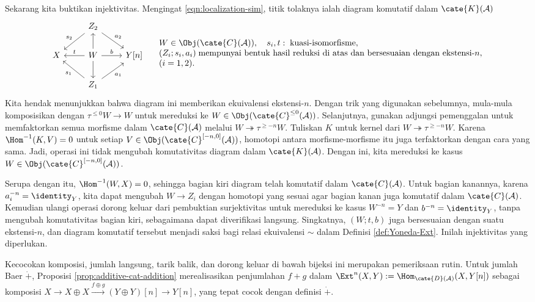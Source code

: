 \begin{bukti}
	Sekarang kita buktikan injektivitas. Mengingat
	\eqref{eqn:localization-sim}, titik tolaknya ialah diagram komutatif dalam
	$\cate{K}(\mathcal{A})$
	\[\begin{tikzcd}
		& Z_2 \arrow[ld, "s_2"'] \arrow[rd, "a_2"] & \\
		X & W \arrow[l, "t"'] \arrow[r, "b"] \arrow[u] \arrow[d] & Y[n] \\
		& Z_1 \arrow[lu, "s_1"] \arrow[ru, "a_1"'] & 
	\end{tikzcd} \quad \begin{array}{l}
		W \in \Obj(\cate{C}(\mathcal{A})), \quad s_i, t: \;\text{kuasi-isomorfisme}, \\
		(Z_i; s_i, a_i) \;\text{mempunyai bentuk hasil reduksi di atas dan bersesuaian dengan ekstensi-$n$},\\
		(i = 1, 2) .
	\end{array}\]
	Kita hendak menunjukkan bahwa diagram ini memberikan ekuivalensi
	ekstensi-$n$. Dengan trik yang digunakan sebelumnya, mula-mula komposisikan
	dengan $\tau^{\leq 0} W \to W$ untuk mereduksi ke
	$W \in \Obj(\cate{C}^{\leq 0}(\mathcal{A}))$. Selanjutnya, gunakan adjungsi
	pemenggalan untuk memfaktorkan semua morfisme dalam $\cate{C}(\mathcal{A})$
	melalui $W \twoheadrightarrow \tau^{\geq -n} W$. Tuliskan $K$
	untuk kernel
	dari $W \twoheadrightarrow \tau^{\geq -n} W$. Karena
	$\Hom^{-1}(K, V) = 0$ untuk setiap
	$V \in \Obj(\cate{C}^{[-n, 0]}(\mathcal{A}))$, homotopi antara
	morfisme-morfisme itu juga terfaktorkan dengan cara yang sama. Jadi,
	operasi ini
	tidak mengubah komutativitas diagram dalam $\cate{K}(\mathcal{A})$. Dengan
	ini, kita mereduksi ke kasus
	$W \in \Obj(\cate{C}^{[-n, 0]}(\mathcal{A}))$.

	Serupa dengan itu, $\Hom^{-1}(W, X) = 0$, sehingga bagian kiri diagram telah
	komutatif dalam $\cate{C}(\mathcal{A})$. Untuk bagian kanannya, karena
	$a_i^{-n} = \identity_Y$, kita dapat mengubah $W \to Z_i$ dengan homotopi
	yang sesuai agar bagian kanan juga komutatif dalam $\cate{C}(\mathcal{A})$.
	Kemudian ulangi operasi dorong keluar dari pembuktian surjektivitas untuk
	mereduksi ke kasus $W^{-n} = Y$ dan $b^{-n} = \identity_Y$, tanpa mengubah
	komutativitas bagian kiri, sebagaimana dapat diverifikasi langsung.
	Singkatnya, $(W; t, b)$ juga
	bersesuaian dengan suatu ekstensi-$n$, dan diagram komutatif tersebut menjadi
	saksi bagi relasi ekuivalensi $\sim$ dalam Definisi \ref{def:Yoneda-Ext}.
	Inilah injektivitas yang diperlukan.
	
	Kecocokan komposisi, jumlah langsung, tarik balik, dan dorong keluar di bawah
	bijeksi ini merupakan pemeriksaan rutin. Untuk jumlah Baer $\dot{+}$,
	Proposisi \ref{prop:additive-cat-addition} merealisasikan penjumlahan $f+g$
	dalam
	$\Ext^n(X, Y) := \Hom_{\cate{D}(\mathcal{A})}(X, Y[n])$ sebagai komposisi
	$X \to X \oplus X \xrightarrow{f \oplus g} (Y \oplus Y)[n] \to Y[n]$,
	yang tepat cocok dengan definisi $\dot{+}$.
\end{bukti}

